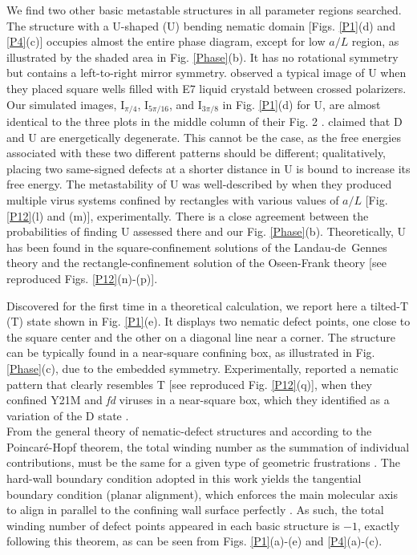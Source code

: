 \documentclass[prl,twocolumn,preprintnumbers,reprint]{revtex4}
\begin{document}
We find two other basic metastable structures in all parameter regions searched. The structure with a U-shaped (U) bending nematic domain [Figs. \ref{P1}(d) and \ref{P4}(c)] occupies almost the entire phase diagram, except for low $a/L$ region, as illustrated by the shaded area in Fig. \ref{Phase}(b). It has no rotational symmetry but contains a left-to-right mirror symmetry.
\citeauthor{Tsakonas2007} observed a typical image of U when they placed square wells filled with {E7} liquid crystald between crossed polarizers. Our simulated images, I$_{\pi/4}$, I$_{5\pi/16}$, and I$_{3\pi/8}$ in Fig. \ref{P1}(d) for U, are almost identical to the three plots in the middle column of their Fig. 2 \cite{Tsakonas2007}.
\citeauthor{Tsakonas2007} claimed that D and U are energetically degenerate. This cannot be the case, as the free energies associated with these two different patterns should be different; qualitatively, placing two same-signed defects at a shorter distance in U is bound to increase its free energy. The metastability of U was well-described by \citeauthor{Lewis2014} when they produced multiple virus systems confined by rectangles with various values of $a/L$ \cite{Lewis2014} [Fig. \ref{P12}(l) and (m)], experimentally. There is a close agreement between the probabilities of finding U assessed there and our Fig. \ref{Phase}(b).
Theoretically, U has been found in the square-confinement solutions of the Landau-de~Gennes theory \cite{Tsakonas2007,Luo2012} and the rectangle-confinement solution of the Oseen-Frank theory \cite{Lewis2014} [see reproduced Figs. \ref{P12}(n)-(p)].

Discovered for the first time in a theoretical calculation, we report here a tilted-T (T) state shown in Fig. \ref{P1}(e). It displays two nematic defect points, one close to the square center and the other on a diagonal line near a corner. The structure can be typically found in a near-square confining box, as illustrated in Fig. \ref{Phase}(c), due to the embedded symmetry.
Experimentally,  \citeauthor {Lewis2014} reported a nematic pattern that clearly resembles T [see reproduced Fig. \ref{P12}(q)], when they confined Y21M and {\it fd} viruses in a near-square box, which they identified as a variation of the D state \cite{Lewis2014}.\\

 From the general theory of nematic-defect structures \cite{Lubensky1992,Nelson2002a,Bowick2009,Turner2010} and according to the Poincar{\' e}-Hopf theorem, the total winding number as the summation of individual contributions,  must be the same for a given type of geometric frustrations \cite{do1976differential}.  The hard-wall boundary condition adopted in this work yields the tangential boundary condition (planar alignment), which enforces the main molecular axis to align in parallel to the confining wall surface perfectly \cite{Poniewierski1988,ChenCui1995}. As such, the total winding number of defect points appeared in each basic structure is $-1$, exactly following this theorem, as can be seen  from Figs. \ref{P1}(a)-(e) and \ref{P4}(a)-(c).
\end{document}
